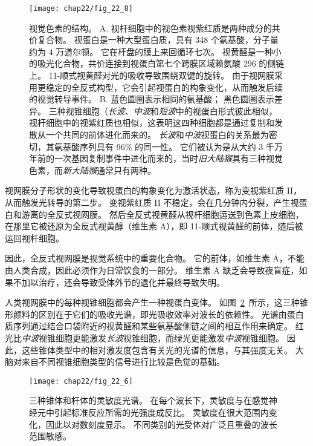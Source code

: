 \begin{figure}[htbp]
	\centering
	\texttt{[image: chap22/fig\_22\_8]}
	\caption{视觉色素的结构。
		A. 视杆细胞中的视色素视紫红质是两种成分的共价复合物。
		视蛋白是一种大型蛋白质，具有 348 个氨基酸，分子量约为 4 万道尔顿。
		它在杆盘的膜上来回循环七次。
		视黄醛是一种小的吸光化合物，共价连接到视蛋白第七个跨膜区域赖氨酸 296 的侧链上。 
		11-顺式视黄醛对光的吸收导致围绕双键的旋转。
		由于视网膜采用更稳定的全反式构型，它会引起视蛋白的构象变化，从而触发后续的视觉转导事件\cite{nathans1984isolation}。
		B. 蓝色圆圈表示相同的氨基酸；
		黑色圆圈表示差异。
		三种视锥细胞（\textit{长波}、\textit{中波}和\textit{短波}中的视蛋白形式彼此相似，视杆细胞中的视紫红质也相似，这表明这四种细胞都是通过复制和发散从一个共同的前体进化而来的。
		\textit{长波}和\textit{中波}视蛋白的关系最为密切，其氨基酸序列具有 96\% 的同一性。
		它们被认为是从大约 3 千万年前的一次基因复制事件中进化而来的，当时\textit{旧大陆猴}具有三种视觉色素，而\textit{新大陆猴}通常只有两种。}
	\label{fig:22_8}
\end{figure}


视网膜分子形状的变化导致视蛋白的构象变化为激活状态，称为变视紫红质 II，从而触发光转导的第二步。
变视紫红质 II 不稳定，会在几分钟内分裂，产生视蛋白和游离的全反式视网膜。
然后全反式视黄醛从视杆细胞运送到色素上皮细胞，在那里它被还原为全反式视黄醇（维生素 A），即 11-顺式视黄醛的前体，随后被运回视杆细胞。


因此，全反式视网膜是视觉系统中的重要化合物。
它的前体，如维生素 A，不能由人类合成，因此必须作为日常饮食的一部分。
维生素 A 缺乏会导致夜盲症，如果不加以治疗，还会导致受体外节的退化并最终导致失明。


人类视网膜中的每种视锥细胞都会产生一种视蛋白变体。 
如图~\ref{fig:22_6}~所示，这三种锥形颜料的区别在于它们的吸收光谱，即光吸收效率对波长的依赖性。
光谱由蛋白质序列通过结合口袋附近的视黄醛和某些氨基酸侧链之间的相互作用来确定。
红光比\textit{中波}视锥细胞更能激发\textit{长波}视锥细胞，而绿光更能激发\textit{中波}视锥细胞。
因此，这些锥体类型中的相对激发度包含有关光的光谱的信息，与其强度无关。
大脑对来自不同视锥细胞类型的信号进行比较是色觉的基础。


\begin{figure}[htbp]
	\centering
	\texttt{[image: chap22/fig\_22\_6]}
	\caption{三种锥体和杆体的灵敏度光谱。 
		在每个波长下，灵敏度与在感觉神经元中引起标准反应所需的光强度成反比。 
		灵敏度在很大范围内变化，因此以对数刻度显示。 
		不同类别的光受体对广泛且重叠的波长范围敏感。}
	\label{fig:22_6}
\end{figure}


